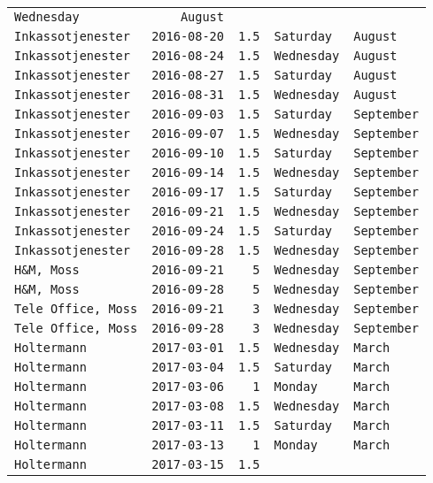 \documentclass[11pt,A4paper,]{article}
\begin{document}
\begin{longtable}[]{@{}lrrll@{}}
\texttt{Wednesday} & \texttt{August}\tabularnewline
\texttt{Inkassotjenester} & \texttt{2016-08-20} & \texttt{1.5} &
\texttt{Saturday} & \texttt{August}\tabularnewline
\texttt{Inkassotjenester} & \texttt{2016-08-24} & \texttt{1.5} &
\texttt{Wednesday} & \texttt{August}\tabularnewline
\texttt{Inkassotjenester} & \texttt{2016-08-27} & \texttt{1.5} &
\texttt{Saturday} & \texttt{August}\tabularnewline
\texttt{Inkassotjenester} & \texttt{2016-08-31} & \texttt{1.5} &
\texttt{Wednesday} & \texttt{August}\tabularnewline
\texttt{Inkassotjenester} & \texttt{2016-09-03} & \texttt{1.5} &
\texttt{Saturday} & \texttt{September}\tabularnewline
\texttt{Inkassotjenester} & \texttt{2016-09-07} & \texttt{1.5} &
\texttt{Wednesday} & \texttt{September}\tabularnewline
\texttt{Inkassotjenester} & \texttt{2016-09-10} & \texttt{1.5} &
\texttt{Saturday} & \texttt{September}\tabularnewline
\texttt{Inkassotjenester} & \texttt{2016-09-14} & \texttt{1.5} &
\texttt{Wednesday} & \texttt{September}\tabularnewline
\texttt{Inkassotjenester} & \texttt{2016-09-17} & \texttt{1.5} &
\texttt{Saturday} & \texttt{September}\tabularnewline
\texttt{Inkassotjenester} & \texttt{2016-09-21} & \texttt{1.5} &
\texttt{Wednesday} & \texttt{September}\tabularnewline
\texttt{Inkassotjenester} & \texttt{2016-09-24} & \texttt{1.5} &
\texttt{Saturday} & \texttt{September}\tabularnewline
\texttt{Inkassotjenester} & \texttt{2016-09-28} & \texttt{1.5} &
\texttt{Wednesday} & \texttt{September}\tabularnewline
\texttt{H\&M,\ Moss} & \texttt{2016-09-21} & \texttt{5} &
\texttt{Wednesday} & \texttt{September}\tabularnewline
\texttt{H\&M,\ Moss} & \texttt{2016-09-28} & \texttt{5} &
\texttt{Wednesday} & \texttt{September}\tabularnewline
\texttt{Tele\ Office,\ Moss} & \texttt{2016-09-21} & \texttt{3} &
\texttt{Wednesday} & \texttt{September}\tabularnewline
\texttt{Tele\ Office,\ Moss} & \texttt{2016-09-28} & \texttt{3} &
\texttt{Wednesday} & \texttt{September}\tabularnewline
\texttt{Holtermann} & \texttt{2017-03-01} & \texttt{1.5} &
\texttt{Wednesday} & \texttt{March}\tabularnewline
\texttt{Holtermann} & \texttt{2017-03-04} & \texttt{1.5} &
\texttt{Saturday} & \texttt{March}\tabularnewline
\texttt{Holtermann} & \texttt{2017-03-06} & \texttt{1} & \texttt{Monday}
& \texttt{March}\tabularnewline
\texttt{Holtermann} & \texttt{2017-03-08} & \texttt{1.5} &
\texttt{Wednesday} & \texttt{March}\tabularnewline
\texttt{Holtermann} & \texttt{2017-03-11} & \texttt{1.5} &
\texttt{Saturday} & \texttt{March}\tabularnewline
\texttt{Holtermann} & \texttt{2017-03-13} & \texttt{1} & \texttt{Monday}
& \texttt{March}\tabularnewline
\texttt{Holtermann} & \texttt{2017-03-15} & \texttt{1.5} &

\end{longtable}
\end{document}
